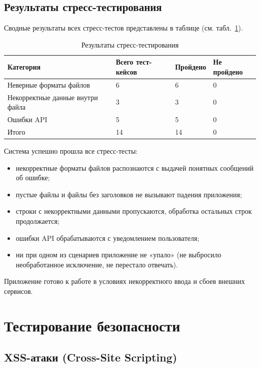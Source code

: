 \subsection{Результаты стресс-тестирования}
Сводные результаты всех стресс-тестов представлены в таблице (см. табл.~\ref{tab:stressResults}).

\begin{table}[H]
\caption{\label{tab:stressResults}Результаты стресс-тестирования}
\small
\begin{center}
\vspace{-0.5cm}\begin{tabular}{|p{7cm}|p{3.5cm}|p{2cm}|p{2.5cm}|}
\hline
Категория & Всего тест-кейсов & Пройдено & Не пройдено \\ \hline
Неверные форматы файлов & 6 & 6 & 0 \\ \hline
Некорректные данные внутри файла & 3 & 3 & 0 \\ \hline
Ошибки API & 5 & 5 & 0 \\ \hline
Итого & 14 & 14 & 0 \\ \hline
\end{tabular}
\end{center}
\end{table}

Система успешно прошла все стресс-тесты:
\begin{itemize}
\item некорректные форматы файлов распознаются с выдачей понятных сообщений об ошибке;
\item пустые файлы и файлы без заголовков не вызывают падения приложения;
\item строки с некорректными данными пропускаются, обработка остальных строк продолжается;
\item ошибки API обрабатываются с уведомлением пользователя;
\item ни при одном из сценариев приложение не «упало» (не выбросило необработанное исключение, не перестало отвечать).
\end{itemize}

Приложение готово к работе в условиях некорректного ввода и сбоев внешних сервисов.

\section{Тестирование безопасности}

\subsection{XSS-атаки (Cross-Site Scripting)}

